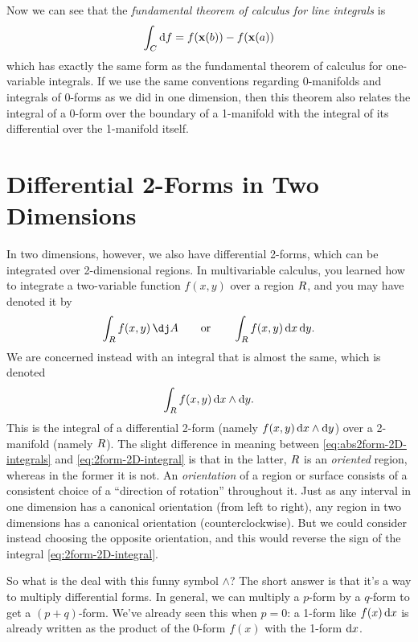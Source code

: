 \documentclass[12pt]{amsart}
\begin{document}
Now we can see that the \emph{fundamental theorem of calculus for line integrals} is
\[ \int_{C} {\mathrm{d} f} = f(\mathbf{x}(b)) - f(\mathbf{x}(a)) \]
which has exactly the same form as the fundamental theorem of calculus for one-variable integrals.
If we use the same conventions regarding 0-manifolds and integrals of 0-forms as we did in one dimension, then this theorem also relates the integral of a 0-form over the boundary of a 1-manifold with the integral of its differential over the 1-manifold itself.

\section{Differential 2-Forms in Two Dimensions}
\label{sec:2forms-in-2D}

In two dimensions, however, we also have differential 2-forms, which can be integrated over 2-dimensional regions.
In multivariable calculus, you learned how to integrate a two-variable function $f(x,y)$ over a region $R$, and you may have denoted it by
\begin{equation}
  \int_\region f(x,y)\,\dA \qquad\text{or}\qquad \int_\region f(x,y)\,\dx\,\dy.\label{eq:abs2form-2D-integrals}
\end{equation}
We are concerned instead with an integral that is almost the same, which is denoted
\begin{equation}
  \int_R f(x,y) \,{\mathrm{d} x}\wedge {\ensuremath{\mathrm{d} y}}.\label{eq:2form-2D-integral}
\end{equation}
This is the integral of a differential 2-form (namely $f(x,y) \,{\mathrm{d} x}\wedge {\ensuremath{\mathrm{d} y}}$) over a 2-manifold (namely $R$).
The slight difference in meaning between \cref{eq:abs2form-2D-integrals} and \cref{eq:2form-2D-integral} is that in the latter, $R$ is an \emph{oriented} region, whereas in the former it is not.
An \emph{orientation} of a region or surface consists of a consistent choice of a ``direction of rotation'' throughout it.
Just as any interval in one dimension has a canonical orientation (from left to right), any region in two dimensions has a canonical orientation (counterclockwise).
But we could consider instead choosing the opposite orientation, and this would reverse the sign of the integral \cref{eq:2form-2D-integral}.

So what is the deal with this funny symbol $\wedge$?
The short answer is that it's a way to multiply differential forms.
In general, we can multiply a $p$-form by a $q$-form to get a $(p+q)$-form.
We've already seen this when $p=0$: a 1-form like $f(x)\,{\mathrm{d} x}$ is already written as the product of the 0-form $f(x)$ with the 1-form ${\mathrm{d} x}$.
\end{document}
